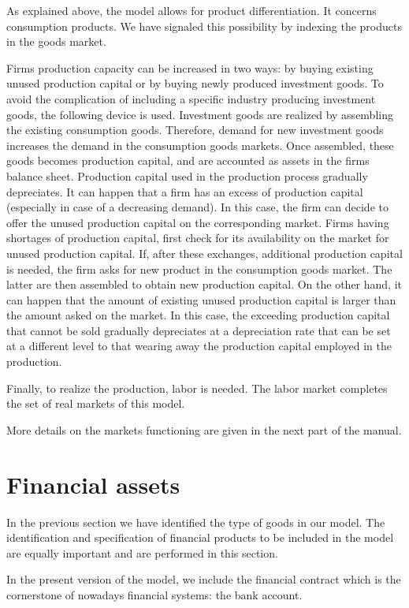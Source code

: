 \documentclass{book}
\begin{document}
As explained above, the model allows for product differentiation. It concerns consumption products. We have signaled this possibility by indexing the products in the goods market.

Firms production capacity can be increased in two ways: by buying existing unused production capital or by buying newly produced investment goods. 
To avoid the complication of including a specific industry producing investment goods, the following device is used. Investment goods are realized by assembling the existing consumption goods. Therefore, demand for new investment goods increases the demand in the consumption goods markets. Once assembled, these goods becomes production capital, and are accounted as assets in the firms balance sheet. Production capital used in the production process gradually depreciates. It can happen that a firm has an excess of production capital (especially in case of a decreasing demand). In this case, the firm can decide to offer the unused production capital on the corresponding market. 
Firms having shortages of production capital, first check for its availability on the market for unused production capital. If, after these exchanges, additional production capital is needed, the firm asks for new product in the consumption goods market. The latter are then assembled to obtain new production capital. On the other hand, it can happen that the amount of existing unused production capital is larger than the amount asked on the market. In this case, the exceeding production capital that cannot be sold gradually depreciates at a depreciation rate that can be set at a different level to that wearing away the production capital employed in the production.

Finally, to realize the production, labor is needed.  The labor market completes the set of real markets of this model.  

More details on the markets functioning are given in the next part of the manual.

\clearpage
\section{Financial assets}

In the previous section we have identified the type of goods in our model. The identification and specification of financial products to be included in the model are equally important and are performed in this section. 

In the present version of the model, we include the financial contract which is the cornerstone of nowadays financial systems: the bank account.
\end{document}
